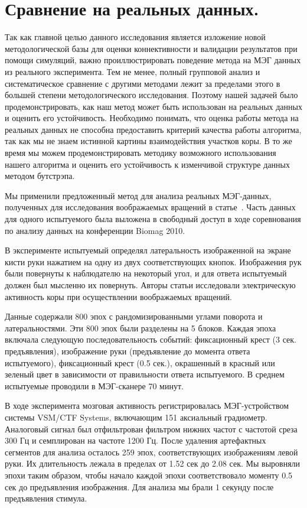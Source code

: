 \section{Сравнение на реальных данных.}\label{sec:validation_on_real_data}
Так как главной целью данного
исследования является изложение новой методологической базы для оценки
коннективности и валидации результатов при помощи симуляций, важно
проиллюстрировать поведение метода на МЭГ данных из реального эксперимента.
Тем не менее, полный групповой анализ и систематическое сравнение с другими
методами лежит за пределами этого в большей степени методологического исследования.
Поэтому нашей задачей было продемонстрировать, как наш метод может быть использован на
реальных данных и оценить его устойчивость.
Необходимо понимать, что оценка работы метода на
реальных данных не способна предоставить критерий качества работы алгоритма, так как
мы не знаем истинной картины взаимодействия участков коры. В то же время мы можем
продемонстрировать методику возможного использования нашего алгоритма и оценить
его устойчивость к изменчивой структуре данных методом бутстрэпа.

Мы применили предложенный метод для анализа реальных МЭГ-данных, полученных для
исследования воображаемых вращений в статье~\cite{DeLange2008}. Часть данных
для одного испытуемого была выложена в свободный доступ в ходе соревнования по
анализу данных на конференции Biomag 2010.

В эксперименте испытуемый определял латеральность изображенной на экране кисти
руки нажатием на одну из двух соответствующих кнопок.  Изображения рук были
повернуты к наблюдателю на некоторый угол, и для ответа испытуемый должен был
мысленно их повернуть. Авторы статьи исследовали электрическую активность коры
при осуществлении воображаемых вращений.

Данные содержали 800 эпох с рандомизированными углами поворота и
латеральностями. Эти 800 эпох были разделены на 5 блоков. Каждая эпоха включала
следующую последовательность событий: фиксационный крест (3 сек. предъявления),
изображение руки (предъявление до момента ответа испытуемого), фиксационный
крест (0.5 сек.), окрашенный в красный или зеленый цвет в зависимости от
правильности ответа испытуемого. В среднем испытуемые проводили в МЭГ-сканере
70 минут.

В ходе эксперимента мозговая активность регистрировалась МЭГ-устройством
системы VSM/CTF Systems, включающим 151 аксиальный градиометр. Аналоговый
сигнал был отфильтрован  фильтром нижних частот с частотой среза 300 Гц и
семплирован на частоте 1200 Гц. После удаления артефактных сегментов для
анализа осталось 259 эпох, соответствующих изображениям левой руки. Их
длительность лежала в пределах от 1.52 сек до 2.08 сек. Мы выровняли эпохи
таким образом, чтобы начало каждой эпохи соответствовало моменту 0.5 сек до
предъявления изображения. Для анализа мы брали 1 секунду после предъявления
стимула.

